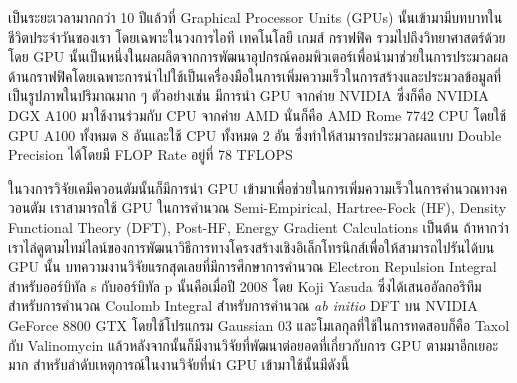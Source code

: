 เป็นระยะเวลามากกว่า 10 ปีแล้วที่ Graphical Processor Units (GPUs) นั้นเข้ามามีบทบาทในชีวิตประจำวันของเรา โดยเฉพาะในวงการไอที เทคโนโลยี เกมส์ กราฟฟิค รวมไปถึงวิทยาศาสตร์ด้วย โดย GPU นั้นเป็นหนึ่งในผลผลิตจากการพัฒนาอุปกรณ์คอมพิวเตอร์เพื่อนำมาช่วยในการประมวลผลด้านกราฟฟิคโดยเฉพาะการนำไปใช้เป็นเครื่องมือในการเพิ่มความเร็วในการสร้างและประมวลข้อมูลที่เป็นรูปภาพในปริมาณมาก ๆ ตัวอย่างเช่น มีการนำ GPU จากค่าย NVIDIA ซึ่งก็คือ NVIDIA DGX A100 มาใช้งานร่วมกับ CPU จากค่าย AMD นั่นก็คือ AMD Rome 7742 CPU โดยใช้ GPU A100 ทั้งหมด 8 อันและใช้ CPU ทั้งหมด 2 อัน ซึ่งทำให้สามารถประมวลผลแบบ Double Precision ได้โดยมี FLOP Rate อยู่ที่ 78 TFLOPS

ในวงการวิจัยเคมีควอนตัมนั้นก็มีการนำ GPU เข้ามาเพื่อช่วยในการเพิ่มความเร็วในการคำนวณทางควอนตัม เราสามารถใช้ GPU ในการคำนวณ Semi-Empirical, Hartree-Fock (HF), Density Functional Theory (DFT), Post-HF, Energy Gradient Calculations เป็นต้น ถ้าหากว่าเราไล่ดูตามไทม์ไลน์ของการพัฒนาวิธีการทางโครงสร้างเชิงอิเล็กโทรนิกส์เพื่อให้สามารถไปรันได้บน GPU นั้น บทความงานวิจัยแรกสุดเลยที่มีการศึกษาการคำนวณ Electron Repulsion Integral สำหรับออร์บิทัล s กับออร์บิทัล p นั้นคือเมื่อปี 2008 โดย Koji Yasuda ซึ่งได้เสนออัลกอริทึมสำหรับการคำนวณ Coulomb Integral สำหรับการคำนวณ \textit{ab initio} DFT บน NVIDIA GeForce 8800 GTX โดยใช้โปรแกรม Gaussian 03 และโมเลกุลที่ใช้ในการทดสอบก็คือ Taxol กับ Valinomycin\autocite{yasuda2008} แล้วหลังจากนั้นก็มีงานวิจัยที่พัฒนาต่อยอดที่เกี่ยวกับการ GPU ตามมาอีกเยอะมาก\autocite{qi2023} สำหรับลำดับเหตุการณ์ในงานวิจัยที่นำ GPU เข้ามาใช้นั้นมีดังนี้
%
